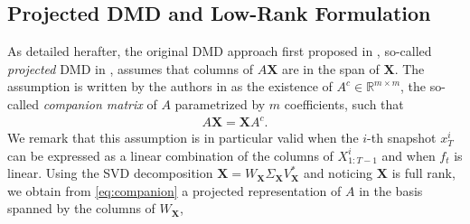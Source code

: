 \documentclass{article}
\newcommand{\Rr}{\mathds{R}}
\newcommand{\XI}{{X}}
\newcommand{\AAA}{\mathbf{X}}
\newcommand{\BBB}{\mathbf{Y}}
\def\remCH#1{{\noindent\color{red}{{\footnotesize [CH: #1]}}}}
\def\addCH#1{{\noindent\color{red}{#1}}}
\begin{document}
 \subsection{Projected DMD and Low-Rank Formulation}
As detailed herafter, the original DMD approach  first proposed in \cite{Schmid10}, so-called \textit{projected} DMD in \cite{Tu2014391}, assumes that columns of $A\AAA$ are in the span of $\AAA $. The assumption is written by the authors in  \cite{Schmid10,Jovanovic12} as the existence of $A^c\in \Rr^{ m \times m}$, the so-called  \textit{companion matrix} of $A$ parametrized by $m$ coefficients, such that%
\begin{align}
A \AAA=\AAA  A^c.\label{eq:companion}
  \end{align} 
  We remark that this assumption is in particular valid when the $i$-th snapshot $x^i_T$ can be expressed as a linear combination of the columns of $\XI_{1:T-1}^i $ and when $f_t$ is linear. 
  Using the  SVD decomposition $\AAA=W_\AAA\Sigma_\AAA V_\AAA^*$ and noticing $\AAA$ is full rank, we obtain  from \eqref{eq:companion}  a projected representation of $A$ in the basis spanned by the columns of $W_\AAA$,  %
\end{document}
